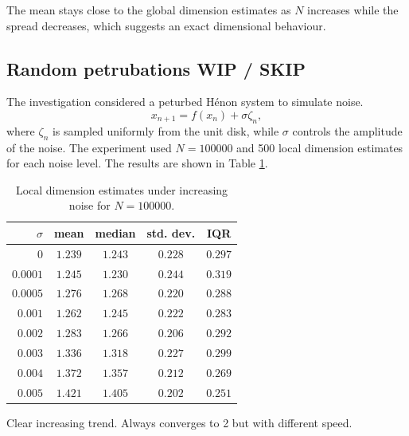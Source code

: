 \documentclass[11pt,a4paper]{article}
\begin{document}
The mean stays close to the global dimension estimates as $N$ increases while the spread decreases, which suggests an exact dimensional behaviour.

\subsection{Random petrubations WIP / SKIP}

The investigation considered a peturbed H\'enon system to simulate noise.
\[
	x_{n+1} = f(x_n) + \sigma \zeta_n,
\]
where \(\zeta _n\) is sampled uniformly from the unit disk, while \(\sigma\) controls the amplitude of the noise.
The experiment used $N=100000$ and 500 local dimension estimates for each noise level. The results are shown in Table \ref{tab:sigma}.

\begin{table}[H]
	\centering
	\begin{tabular}{rcccc}
		\toprule
		$\sigma$ & mean    & median  & std. dev. & IQR     \\
		\midrule
		$0$      & $1.239$ & $1.243$ & $0.228$   & $0.297$ \\
		$0.0001$ & $1.245$ & $1.230$ & $0.244$   & $0.319$ \\
		$0.0005$ & $1.276$ & $1.268$ & $0.220$   & $0.288$ \\
		$0.001$  & $1.262$ & $1.245$ & $0.222$   & $0.283$ \\
		$0.002$  & $1.283$ & $1.266$ & $0.206$   & $0.292$ \\
		$0.003$  & $1.336$ & $1.318$ & $0.227$   & $0.299$ \\
		$0.004$  & $1.372$ & $1.357$ & $0.212$   & $0.269$ \\
		$0.005$  & $1.421$ & $1.405$ & $0.202$   & $0.251$ \\
		\bottomrule
	\end{tabular}
	\caption{Local dimension estimates under increasing noise for $N=100000$.}
	\label{tab:sigma}
\end{table}
Clear increasing trend. Always converges to 2 but with different speed.
\end{document}
